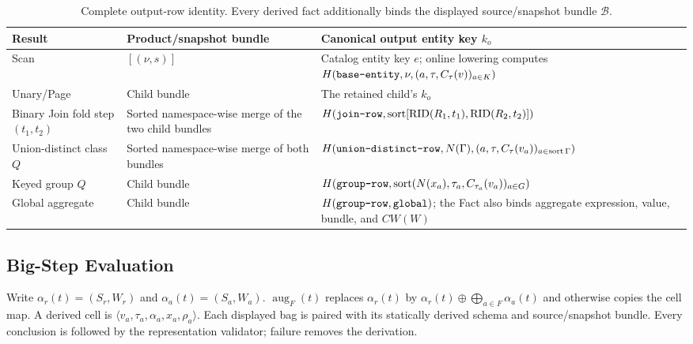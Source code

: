 \documentclass[journal,onecolumn]{IEEEtran}
\newcommand{\code}[1]{\texttt{\detokenize{#1}}}
\begin{document}
\begin{table}[H]
\centering
\caption{Complete output-row identity. Every derived fact additionally binds
the displayed source/snapshot bundle $\mathcal B$.}
\label{tab:rowkeys-supp}
\small
\begin{tabular}{L{0.13\textwidth}L{0.19\textwidth}L{0.59\textwidth}}
\toprule
Result & Product/snapshot bundle & Canonical output entity key $k_o$ \\
\midrule
Scan & $[(\nu,s)]$ & Catalog entity key $e$; online lowering computes
$H(\code{base-entity},\nu,(a,\tau,C_\tau(v))_{a\in K})$ \\
Unary/Page & Child bundle & The retained child's $k_o$ \\
Binary Join fold step $(t_1,t_2)$ & Sorted namespace-wise merge of the two child bundles & $H(\code{join-row},\operatorname{sort}[\operatorname{RID}(R_1,t_1),\operatorname{RID}(R_2,t_2)])$ \\
Union-distinct class $Q$ & Sorted namespace-wise merge of both bundles & $H(\code{union-distinct-row},N(\Gamma),(a,\tau,C_\tau(v_a))_{a\in\operatorname{sort}\Gamma})$ \\
Keyed group $Q$ & Child bundle & $H(\code{group-row},\operatorname{sort}(N(x_a),\tau_a,C_{\tau_a}(v_a))_{a\in G})$ \\
Global aggregate & Child bundle & $H(\code{group-row},\code{global})$; the Fact also binds aggregate expression, value, bundle, and $CW(W)$ \\
\bottomrule
\end{tabular}
\end{table}

\subsection{Big-Step Evaluation}

Write $\alpha_r(t)=(S_r,W_r)$ and $\alpha_a(t)=(S_a,W_a)$.
$\operatorname{aug}_F(t)$ replaces $\alpha_r(t)$ by
$\alpha_r(t)\oplus\bigoplus_{a\in F}\alpha_a(t)$ and otherwise copies the
cell map. A derived cell is
$\langle v_a,\tau_a,\alpha_a,x_a,\rho_a\rangle$. Each displayed bag is paired
with its statically derived schema and source/snapshot bundle. Every conclusion
is followed by the representation validator; failure removes the derivation.
\end{document}
